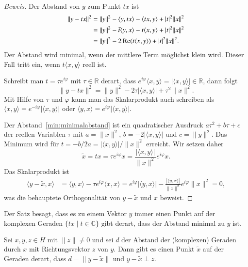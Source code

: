 \begin{proof}[Beweis]
Der Abstand von $y$ zum Punkt $tx$ ist
\begin{align*}
\| y-tx \|^2
&=
\|y\|^2
-\langle y,tx\rangle
-\langle tx,y\rangle
+
|t|^2\|x\|^2
\notag
\\
&=
\|y\|^2
-\bar{t} \langle y,x\rangle
-t \langle x,y\rangle
+
|t|^2\|x\|^2
\notag
\\
&=
\|y\|^2
-2\operatorname{Re}(t\langle x,y\rangle)
+
|t|^2\|x\|^2.
\end{align*}
Der Abstand wird minimal, wenn der mittlere Term möglichst klein wird.
Dieser Fall tritt ein, wenn $t\langle x,y\rangle$ reell ist.

Schreibt man $t=\tau e^{i\varphi}$ mit $\tau\in\mathbb R$ derart, dass
$e^{i\varphi}\langle x,y\rangle=|\langle x,y\rangle|\in\mathbb R$,
dann folgt
\begin{equation}
\| y-tx \|^2
=
\|y\|^2
-2\tau|\langle x,y\rangle|
+
\tau^2\|x\|^2.
\label{min:minimalabstand}
\end{equation}
Mit Hilfe von $\tau$ und $\varphi$ kann man das Skalarprodukt auch
schreiben als $\langle x,y\rangle = e^{-i\varphi}|\langle x,y\rangle|$
oder $\langle y,x\rangle = e^{i\varphi}|\langle x,y\rangle|$.

Der Abstand~\eqref{min:minimalabstand} ist ein quadratischer Ausdruck
$a\tau^2 + b\tau +c$ der reellen Variablen $\tau$ mit
$a=\|x\|^2$, $b=-2|\langle x,y\rangle|$ und $c=\|y\|^2$.
Das Minimum wird für $t=-b/2a=|\langle x,y\rangle|/\|x\|^2$ erreicht.
Wir setzen daher
\[
\tilde{x}
=
tx
=
\tau e^{i\varphi}x
=
\frac{|\langle x,y\rangle|}{\|x\|^2}
e^{i\varphi}x.
\]
Das Skalarprodukt ist
\begin{align*}
\langle y-\tilde x,x\rangle
&=
\langle y,x\rangle - \tau e^{i\varphi}\langle x,x\rangle
=
e^{i\varphi}|\langle y,x\rangle|
- \frac{|\langle y,x\rangle|}{\|x\|^2} e^{i\varphi}\|x\|^2
=
0,
\end{align*}
was die behauptete Orthogonalität von $y-\tilde{x}$ und $x$ beweist.
\end{proof}

Der Satz besagt, dass es zu einem Vektor $y$ immer einen Punkt auf der 
komplexen Geraden $\{ tx\;|\; t\in\mathbb C\}$ gibt derart, dass der Abstand
minimal zu $y$ ist.

\begin{satz}
\label{satz:minimalallgemein}
Sei $x,y,z\in H$ mit $\|z\|\ne 0$ und sei $d$ der Abstand der (komplexen)
Geraden durch $x$ mit Richtungsvektor $z$ von $y$.
Dann gibt es einen Punkt $\tilde{x}$ auf der Geraden derart, dass
$d=\|y-\tilde{x}\|$ und $y-\tilde{x}\perp z$.
\end{satz}

